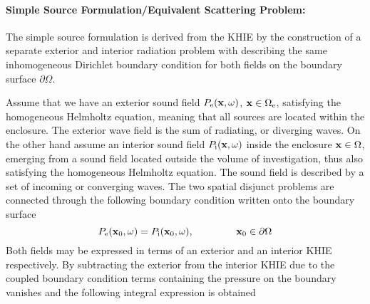 \paragraph{Simple Source Formulation/Equivalent Scattering Problem:\\}

The simple source formulation is derived from the KHIE by the construction of a separate exterior and interior radiation problem with describing the same inhomogeneous Dirichlet boundary condition for both fields on the boundary surface $\partial \Omega$.

Assume that we have an exterior sound field $P_{\mathrm{e}}(\mathbf{x},\omega)$, $\mathbf{x} \in \Omega_{\mathrm{e}}$, satisfying the homogeneous Helmholtz equation, meaning that all sources are located within the enclosure. The exterior wave field is the sum of  radiating, or diverging waves. On the other hand assume an interior sound field $P_{\mathrm{i}}(\mathbf{x},\omega)$ inside the enclosure $\mathbf{x} \in \Omega$, emerging from a sound field located outside the volume of investigation, thus also satisfying the homogeneous Helmholtz equation. The sound field is described by a set of incoming or converging waves.
The two spatial disjunct problems are connected through the following boundary condition written onto the boundary surface
\begin{equation}
P_{\mathrm{e}}(\vxo,\omega) = P_{\mathrm{i}}(\vxo,\omega), \hspace{15mm} \vxo \in \partial \Omega
\end{equation}
Both fields may be expressed in terms of an exterior and an interior KHIE respectively.
By subtracting the exterior from the interior KHIE due to the coupled boundary condition terms containing the pressure on the boundary vanishes and the following integral expression is obtained

